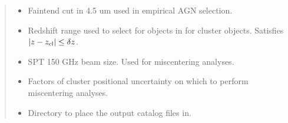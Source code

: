 \documentclass[letterpaper,12pt,english]{sphinxmanual}
\begin{document}
\begin{fulllineitems}
\begin{fulllineitems}
\begin{quote}
\begin{description}
\begin{itemize}
\item {} 
\sphinxAtStartPar
{} \textendash{} Faint\sphinxhyphen{}end cut in 4.5 um used in empirical AGN selection.

\item {} 
\sphinxAtStartPar
{} \textendash{} Redshift range used to select for objects in  for cluster objects. Satisfies
\(|z - z_{\rm cl} | \leq \delta z\).

\item {} 
\sphinxAtStartPar
{} \textendash{} SPT 150 GHz beam size. Used for miscentering analyses.

\item {} 
\sphinxAtStartPar
{} \textendash{} Factors of cluster positional uncertainty on which to perform miscentering analyses.

\item {} 
\sphinxAtStartPar
{} \textendash{} Directory to place the output catalog files in.

\end{itemize}

\end{description}\end{quote}

\end{fulllineitems}



\end{fulllineitems}
\end{document}
